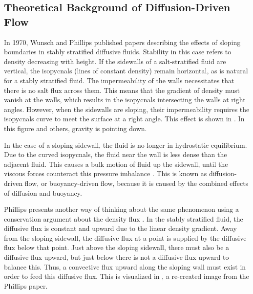 \documentclass[12pt]{article}
\begin{document}
\subsection{Theoretical Background of Diffusion-Driven Flow}

In 1970, Wunsch \cite{WUNSCH1970293} and Phillips \cite{phillips1970flows} published papers describing the effects of sloping boundaries in stably stratified diffusive fluids. Stability in this case refers to density decreasing with height. If the sidewalls of a salt-stratified fluid are vertical, the isopycnals (lines of constant density) remain horizontal, as is natural for a stably stratified fluid. The impermeability of the walls necessitates that there is no salt flux across them. This means that the gradient of density must vanish at the walls, which results in the isopycnals intersecting the walls at right angles. However, when the sidewalls are sloping, their impermeability requires the isopycnals curve to meet the surface at a right angle. This effect is shown in . In this figure and others, gravity is pointing down.


In the case of a sloping sidewall, the fluid is no longer in hydrostatic equilibrium. Due to the curved isopycnals, the fluid near the wall is less dense than the adjacent fluid. This causes a bulk motion of fluid up the sidewall, until the viscous forces counteract this pressure imbalance \cite{phillips1970flows}. This is known as diffusion-driven flow, or buoyancy-driven flow, because it is caused by the combined effects of diffusion and buoyancy.

Phillips presents another way of thinking about the same phenomenon using a conservation argument about the density flux \cite{phillips1970flows}. In the stably stratified fluid, the diffusive flux is constant and upward due to the linear density gradient. Away from the sloping sidewall, the diffusive flux at a point is supplied by the diffusive flux below that point. Just above the sloping sidewall, there must also be a diffusive flux upward, but just below there is not a diffusive flux upward to balance this. Thus, a convective flux upward along the sloping wall must exist in order to feed this diffusive flux. This is visualized in , a re-created image from the Phillips paper.
\end{document}
